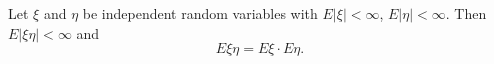Let $\xi$ and $\eta$ be independent random variables with $E|\xi| < \infty$, $E|\eta| < \infty$. Then $E|\xi\eta| < \infty$ and
$$E\xi\eta = E\xi \cdot E\eta.$$
